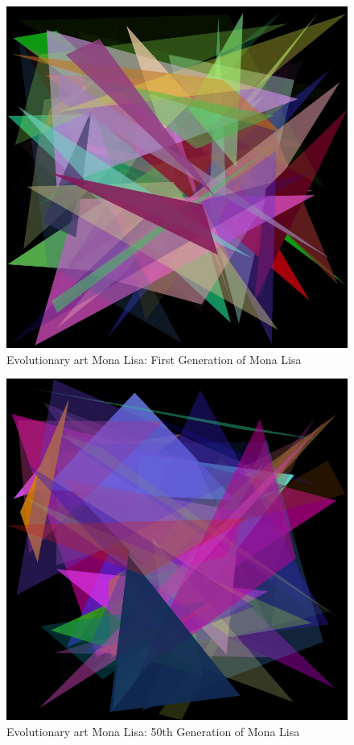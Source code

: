 \documentclass[12pt]{article}
\begin{document}
\begin{figure}[h]
    \centering
    \includegraphics[width=1\textwidth]{images/Monagen1.jpg}
    \caption{Evolutionary art Mona Lisa: First Generation of Mona Lisa}
\end{figure}

\newpage

\begin{figure}[h]
    \centering
    \includegraphics[width=1\textwidth]{gen_mona.png}
    \caption{Evolutionary art Mona Lisa: 50th Generation of Mona Lisa}
\end{figure}
\end{document}
